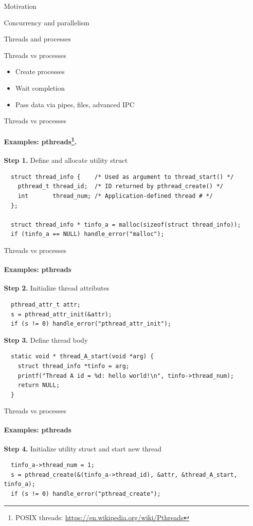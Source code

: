 \begin{section}{Motivation}
\begin{section}{Concurrency and parallelism}
\begin{section}{Threads and processes}
\begin{frame}[fragile]{Threads vs processes}
\pause
\begin{itemize}
     \item Create processes
     \item Wait completion
     \item Pass data via pipes, files, advanced IPC
\end{itemize}

\end{frame}

\begin{frame}[fragile]{Threads vs processes}
\framesubtitle{Examples: pthreads\footnote{POSIX threads: \url{https://en.wikipedia.org/wiki/Pthreads}}.}

\textbf{Step 1.} Define and allocate utility struct

\begin{verbatim}
  struct thread_info {    /* Used as argument to thread_start() */
    pthread_t thread_id;  /* ID returned by pthread_create() */
    int       thread_num; /* Application-defined thread # */
  };

  struct thread_info * tinfo_a = malloc(sizeof(struct thread_info));
  if (tinfo_a == NULL) handle_error("malloc");
\end{verbatim}
\end{frame}


\begin{frame}{Threads vs processes}
\framesubtitle{Examples: pthreads}

\textbf{Step 2.} Initialize thread attributes
\begin{verbatim}
  pthread_attr_t attr;
  s = pthread_attr_init(&attr);
  if (s != 0) handle_error("pthread_attr_init");
\end{verbatim}


\textbf{Step 3.} Define thread body
\begin{verbatim}
  static void * thread_A_start(void *arg) {
    struct thread_info *tinfo = arg;
    printf("Thread A id = %d: hello world!\n", tinfo->thread_num);
    return NULL;
  }
\end{verbatim}
\end{frame}

\begin{frame}{Threads vs processes}
\framesubtitle{Examples: pthreads}

\textbf{Step 4.} Initialize utility struct and start new thread
\begin{verbatim}
  tinfo_a->thread_num = 1;
  s = pthread_create(&(tinfo_a->thread_id), &attr, &thread_A_start, tinfo_a);
  if (s != 0) handle_error("pthread_create");
\end{verbatim}


\end{frame}
\end{section}
\end{section}
\end{section}
